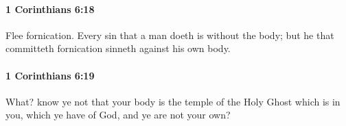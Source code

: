 		\paragraph{1 Corinthians 6:18} %
			\label{1CORINTHIANS-6-18}

			Flee fornication. Every sin that a man doeth is without the body; but he that committeth fornication sinneth against his own body.

			\begin{framed}
			\scriptsize
				\begin{compactdesc}
					\item[SBLG] 
				\end{compactdesc}
			\end{framed}

		\paragraph{1 Corinthians 6:19} %
			\label{1CORINTHIANS-6-19}

			What? know ye not that your body is the temple of the Holy Ghost which is in you, which ye have of God, and ye are not your own?

